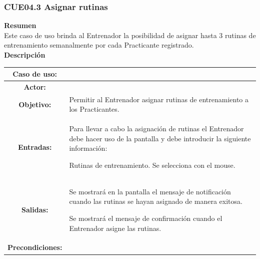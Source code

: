 \subsubsection{CUE04.3 Asignar rutinas}
\label{cu:CUE04.3}

\textbf{\textcolor[rgb]{0, 0, 0.545098}{Resumen}} \\

Este caso de uso brinda al Entrenador la posibilidad de asignar hasta 3 rutinas de entrenamiento semanalmente por cada Practicante registrado.\\

\textbf{\textcolor[rgb]{0, 0, 0.545098}{Descripción}}

\begin{table}[H]
\centering
\begin{tabular}{| c | p{12 cm} |}
\hline
\rowcolor[rgb]{0.529412, 0.807843, 0.980392} {\textbf{Caso de uso:}} & \hspace{7em}{\textbf{CUE04.3 Asignar rutinas}}\\
\hline
\textbf{Actor:} &  \nameref{act:Entrenador} \\
\hline
\textbf{Objetivo:} & Permitir al Entrenador asignar rutinas de entrenamiento a los Practicantes.\\
\hline
\textbf{Entradas:} & Para llevar a cabo la asignación de rutinas el Entrenador debe hacer uso de la pantalla \nameref{pant:IUE04.3} y debe introducir la siguiente información:
	\begin{compactitem} 
			\setlength\itemsep{-0.25em}
			\item Rutinas de entrenamiento. Se selecciona con el mouse.
	\end{compactitem} \\
\hline
\textbf{Salidas:} & \vspace{-2mm}	%
					\begin{compactitem}
						\setlength\itemsep{-0.25em}
						\item Se mostrará en la pantalla \nameref{pant:IUE04.3} el mensaje de notificación \nameref{msj:MSG01} cuando las rutinas se hayan asignado de manera exitosa.
						\item Se mostrará el mensaje de confirmación \nameref{msj:MSG07} cuando el Entrenador asigne las rutinas.
					\end{compactitem}\\
\hline
\textbf{Precondiciones:} & \vspace{-2mm}	%

\end{tabular}
\end{table}
